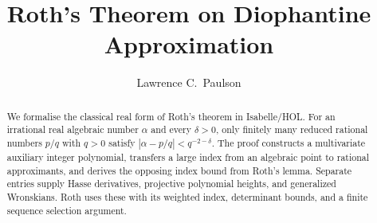 \documentclass[11pt,a4paper]{article}
\begin{document}
\title{Roth's Theorem on Diophantine Approximation}
\author{Lawrence C.\ Paulson}
\maketitle

\begin{abstract}
We formalise the classical real form of Roth's theorem in Isabelle/HOL.
For an irrational real algebraic number $\alpha$ and every $\delta>0$,
only finitely many reduced rational numbers $p/q$ with $q>0$ satisfy
$|\alpha-p/q|<q^{-2-\delta}$. The proof constructs a multivariate
auxiliary integer polynomial, transfers a large index from an algebraic
point to rational approximants, and derives the opposing index bound
from Roth's lemma. Separate entries supply Hasse derivatives, projective polynomial
heights, and generalized Wronskians. Roth uses these with its weighted index,
determinant bounds, and a finite sequence selection argument.
\end{abstract}


\end{document}
